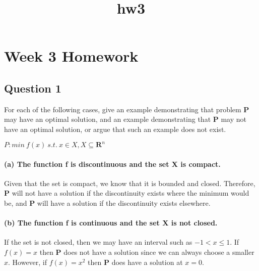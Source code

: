 \documentclass[11pt]{article}
\title{hw3}
\def\lt{<}
\begin{document}
    
    
    \maketitle
    
    

    
    \hypertarget{week-3-homework}{%
\section{Week 3 Homework}\label{week-3-homework}}

    \hypertarget{question-1}{%
\subsection{Question 1}\label{question-1}}

For each of the following cases, give an example demonstrating that
problem \(\mathbf{P}\) may have an optimal solution, and an example
demonstrating that \(\mathbf{P}\) may not have an optimal solution, or
argue that such an example does not exist.

\(P: min \ f(x) \ s.t. \ x \in X, X \subseteq \mathbf{R}^n\)

\hypertarget{a-the-function-f-is-discontinuous-and-the-set-x-is-compact.}{%
\paragraph{(a) The function f is discontinuous and the set X is
compact.}\label{a-the-function-f-is-discontinuous-and-the-set-x-is-compact.}}

Given that the set is compact, we know that it is bounded and closed.
Therefore, \(\mathbf{P}\) will not have a solution if the discontinuity
exists where the minimum would be, and \(\mathbf{P}\) will have a
solution if the discontinuity exists elsewhere.

\hypertarget{b-the-function-f-is-continuous-and-the-set-x-is-not-closed.}{%
\paragraph{(b) The function f is continuous and the set X is not
closed.}\label{b-the-function-f-is-continuous-and-the-set-x-is-not-closed.}}

If the set is not closed, then we may have an interval such as
\(-1 \lt x \le 1\). If \(f(x) = x\) then \(\mathbf{P}\) does not have a
solution since we can always choose a smaller \(x\). However, if
\(f(x) = x^2\) then \(\mathbf{P}\) does have a solution at \(x = 0\).
\end{document}
